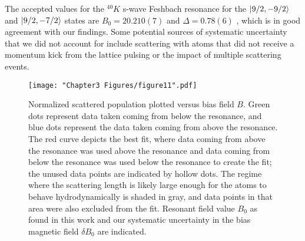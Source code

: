 The accepted values for the $^{40}K$ s-wave Feshbach resonance for the  $\mathinner{|{9/2,-9/2}\rangle}$ and $\mathinner{|{9/2,-7/2}\rangle}$ states are $B_0=20.210(7)$  \mT{} and $\Delta=0.78(6)$  \mT{} \cite{Regal04}, which is in good agreement with our findings. Some potential sources of systematic uncertainty that we did not account for include scattering with atoms that did not receive a momentum kick from the lattice pulsing or the impact of multiple scattering events.
\begin{figure}
	\texttt{[image: "Chapter3 Figures/figure11".pdf]}
\caption[Normalized scattered population vs bias field $B$]{Normalized scattered population plotted versus bias field $B$. Green dots represent data taken coming from below the resonance, and blue dots represent the data taken coming from above the resonance. The red curve depicts the best fit, where data coming from above the resonance was used above the resonance and data coming from below the resonance was used below the resonance to create the fit; the unused data points are indicated by hollow dots. The regime where the scattering length is likely large enough for the atoms to behave hydrodynamically is shaded in gray, and data points in that area were also excluded from the fit. Resonant field value $B_0$ as found in this work and our systematic uncertainty in the bias magnetic field $\delta B_0$ are indicated.    }
\label{fig:fittedFractions}
\end{figure}

